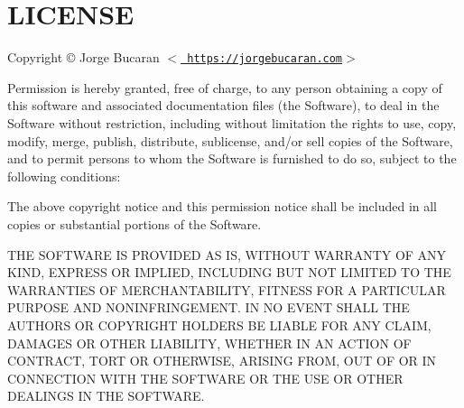 \chapter{LICENSE}
\hypertarget{md_node__modules_2colorette_2_l_i_c_e_n_s_e}{}\label{md_node__modules_2colorette_2_l_i_c_e_n_s_e}
Copyright © Jorge Bucaran \texorpdfstring{$<$}{<}\href{https://jorgebucaran.com}{\texttt{ https\+://jorgebucaran.\+com}}\texorpdfstring{$>$}{>}

Permission is hereby granted, free of charge, to any person obtaining a copy of this software and associated documentation files (the \textquotesingle{}Software\textquotesingle{}), to deal in the Software without restriction, including without limitation the rights to use, copy, modify, merge, publish, distribute, sublicense, and/or sell copies of the Software, and to permit persons to whom the Software is furnished to do so, subject to the following conditions\+:

The above copyright notice and this permission notice shall be included in all copies or substantial portions of the Software.

THE SOFTWARE IS PROVIDED \textquotesingle{}AS IS\textquotesingle{}, WITHOUT WARRANTY OF ANY KIND, EXPRESS OR IMPLIED, INCLUDING BUT NOT LIMITED TO THE WARRANTIES OF MERCHANTABILITY, FITNESS FOR A PARTICULAR PURPOSE AND NONINFRINGEMENT. IN NO EVENT SHALL THE AUTHORS OR COPYRIGHT HOLDERS BE LIABLE FOR ANY CLAIM, DAMAGES OR OTHER LIABILITY, WHETHER IN AN ACTION OF CONTRACT, TORT OR OTHERWISE, ARISING FROM, OUT OF OR IN CONNECTION WITH THE SOFTWARE OR THE USE OR OTHER DEALINGS IN THE SOFTWARE. 